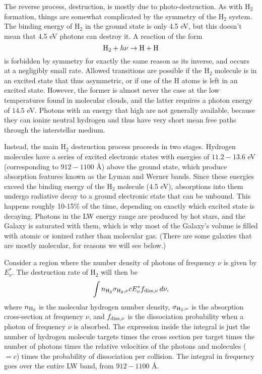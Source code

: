 The reverse process, destruction, is mostly due to photo-destruction. As with H$_2$ formation, things are somewhat complicated by the symmetry of the H$_2$ system. The binding energy of H$_2$ in the ground state is only 4.5 eV, but this doesn't mean that 4.5 eV photons can destroy it. A reaction of the form
\begin{equation}
{\rm H_2} + h\nu \rightarrow {\rm H}+{\rm H}
\end{equation}
is forbidden by symmetry for exactly the same reason as its inverse, and occurs at a negligibly small rate. Allowed transitions are possible if the H$_2$ molecule is in an excited state that thus asymmetric, or if one of the H atoms is left in an excited state. However, the former is almost never the case at the low temperatures found in molecular clouds, and the latter requires a photon energy of $14.5$ eV. Photons with an energy that high are not generally available, because they can ionize neutral hydrogen and thus have very short mean free paths through the interstellar medium.

Instead, the main H$_2$ destruction process proceeds in two stages. Hydrogen molecules have a series of excited electronic states with energies of $11.2-13.6$ eV (corresponding to $912-1100$ \AA) above the ground state, which produce absorption features known as the Lyman and Werner bands. Since these energies exceed the binding energy of the H$_2$ molecule (4.5 eV), absorptions into them undergo radiative decay to a ground electronic state that can be unbound. This happens roughly 10-15\% of the time, depending on exactly which excited state is decaying. Photons in the LW energy range are produced by hot stars, and the Galaxy is saturated with them, which is why most of the Galaxy's volume is filled with atomic or ionized rather than molecular gas. (There are some galaxies that are mostly molecular, for reasons we will see below.)

Consider a region where the number density of photons of frequency $\nu$ is given by $E^*_{\nu}$. The destruction rate of H$_2$ will then be
\begin{equation}
\int n_{{\rm H}_2} \sigma_{{\rm H}_2,\nu} c E^*_{\nu} f_{{\rm diss,}\nu}\, d\nu,
\end{equation}
where $n_{\rm H_2}$ is the molecular hydrogen number density, $\sigma_{{\rm H}_2,\nu}$ is the absorption cross-section at frequency $\nu$, and $f_{{\rm diss,}\nu}$ is the dissociation probability when a photon of frequency $\nu$ is absorbed. The expression inside the integral is just the number of hydrogen molecule targets times the cross section per target times the number of photons times the relative velocities of the photons and molecules ($=c$) times the probability of dissociation per collision. The integral in frequency goes over the entire LW band, from $912-1100$ \AA.

